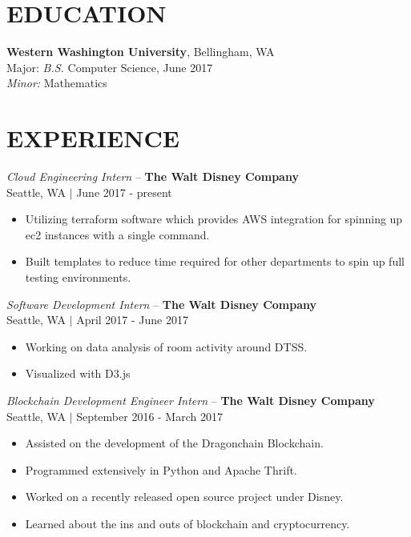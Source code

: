 \documentclass[line,margin]{res}
\begin{document}
\address{406.261.0065 $|$ alex@alex-benedetto.com $|$ github.com/wolfpack94}

\begin{resume}

\section{EDUCATION}
	{\bf Western Washington University}, Bellingham, WA \\
	Major: {\sl B.S.} Computer Science, {\small June 2017}\\
	{\sl Minor:} Mathematics
\section{EXPERIENCE}
	{\sl Cloud Engineering Intern} -- {\bf The Walt Disney Company}\\ 
	{\footnotesize Seattle, WA $|$ June 2017 - present}\\
	\begin{itemize} \itemsep -2pt
		\item Utilizing terraform software which provides AWS integration for spinning up ec2 instances with a single command.
		\item Built templates to reduce time required for other departments to spin up full testing environments.
	\end{itemize}
	{\sl Software Development Intern} -- {\bf The Walt Disney Company}\\ 
	{\footnotesize Seattle, WA $|$ April 2017 - June 2017}\\
	\begin{itemize} \itemsep -2pt
		\item Working on data analysis of room activity around DTSS.
		\item Visualized with D3.js
	\end{itemize}
	{\sl Blockchain Development Engineer Intern} -- {\bf The Walt Disney Company}\\ 
	{\footnotesize Seattle, WA $|$ September 2016 - March 2017}\\
	\begin{itemize} \itemsep -2pt
		\item Assisted on the development of the Dragonchain Blockchain.
		\item Programmed extensively in Python and Apache Thrift.
		\item Worked on a recently released open source project under Disney.
		\item Learned about the ins and outs of blockchain and cryptocurrency.

\end{itemize}
\end{resume}
\end{document}
